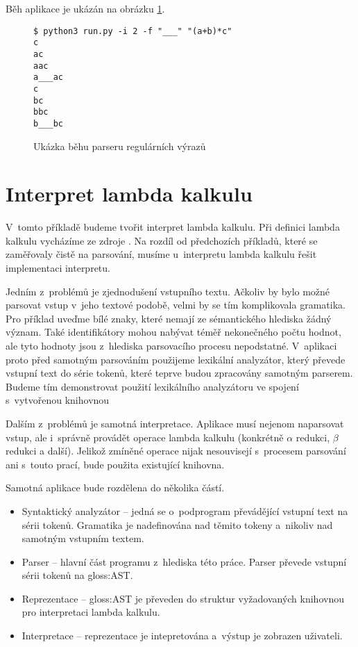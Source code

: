 		Běh aplikace je ukázán na obrázku \ref{pic:runRegexInverse}.
		
		\begin{figure}
			\begin{verbatim}
$ python3 run.py -i 2 -f "___" "(a+b)*c"
c
ac
aac
a___ac
c
bc
bbc
b___bc
			\end{verbatim}
			\caption{Ukázka běhu parseru regulárních výrazů}
			\label{pic:runRegexInverse}
		\end{figure}
	
	\section{Interpret lambda kalkulu}
	
		V~tomto příkladě budeme tvořit interpret lambda kalkulu. Při definici lambda kalkulu vycházíme ze zdroje \cite{hindley1986introduction}. Na rozdíl od předchozích příkladů, které se zaměřovaly čistě na parsování, musíme u~interpretu lambda kalkulu řešit implementaci interpretu. 
		
		Jedním z~problémů je zjednodušení vstupního textu. Ačkoliv by bylo možné parsovat vstup v~jeho textové podobě, velmi by se tím komplikovala gramatika. Pro příklad uveďme bílé znaky, které nemají ze sémantického hlediska žádný význam. Také identifikátory mohou nabývat téměř nekonečného počtu hodnot, ale tyto hodnoty jsou z~hlediska parsovacího procesu nepodstatné. V~aplikaci proto před samotným parsováním použijeme lexikální analyzátor, který převede vstupní text do série tokenů, které teprve budou zpracovány samotným parserem. Budeme tím demonstrovat použití lexikálního analyzátoru ve spojení s~vytvořenou knihovnou
		
		Dalším z~problémů je samotná interpretace. Aplikace musí nejenom naparsovat vstup, ale i~správně provádět operace lambda kalkulu (konkrétně $\alpha$ redukci, $\beta$ redukci a další). Jelikož zmíněné operace nijak nesouvisejí s~procesem parsování ani s~touto prací, bude použita existující knihovna.
		
		Samotná aplikace bude rozdělena do několika částí.
		\begin{itemize}
			\item Syntaktický analyzátor -- jedná se o~podprogram převádějící vstupní text na sérii tokenů. Gramatika je nadefinována nad těmito tokeny a~nikoliv nad samotným vstupním textem.
			\item Parser -- hlavní část programu z~hlediska této práce. Parser převede vstupní sérii tokenů na \gls{gloss:AST}.
			\item Reprezentace -- \gls{gloss:AST} je převeden do struktur vyžadovaných knihovnou pro interpretaci lambda kalkulu.
			\item Interpretace -- reprezentace je intepretována a~výstup je zobrazen uživateli.
		\end{itemize}
	

